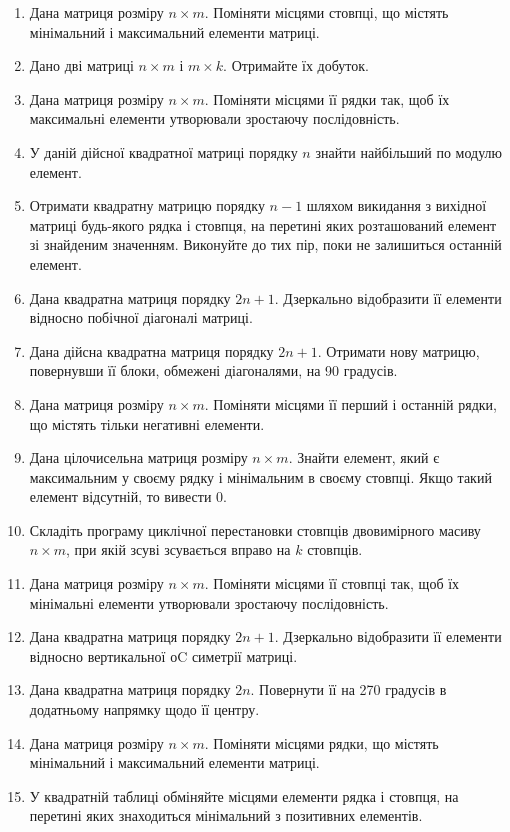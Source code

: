 \documentclass[a5paper,titlepage,openany,twoside,draft]{book_unv}%
\begin{document}
\begin{enumerate}
\item
  Дана матриця розміру $n \times m$. Поміняти місцями стовпці, що містять
  мінімальний і максимальний елементи матриці.
\item
  Дано дві матриці $n \times m$ і $m \times k$. Отримайте їх добуток.
\item
  Дана матриця розміру $n \times m$. Поміняти місцями її рядки так, щоб їх
  максимальні елементи утворювали зростаючу послідовність.
\item
  У даній дійсної квадратної матриці порядку $n$ знайти найбільший по
  модулю елемент.
\item
  Отримати квадратну матрицю порядку $n - 1$ шляхом викидання з вихідної
  матриці будь-якого рядка і стовпця, на перетині яких розташований
  елемент зі знайденим значенням. Виконуйте до тих пір, поки не
  залишиться останній елемент.
\item
  Дана квадратна матриця порядку $2n + 1$. Дзеркально відобразити її
  елементи відносно побічної діагоналі матриці.
\item
  Дана дійсна квадратна матриця порядку $2n + 1$. Отримати нову матрицю,
  повернувши її блоки, обмежені діагоналями, на 90 градусів.
\item
  Дана матриця розміру $n \times m$. Поміняти місцями її перший і останній
  рядки, що містять тільки негативні елементи.
\item
  Дана цілочисельна матриця розміру $n \times m$. Знайти елемент, який є
  максимальним у своєму рядку і мінімальним в своєму стовпці. Якщо такий
  елемент відсутній, то вивести 0.
\item
  Складіть програму циклічної перестановки стовпців двовимірного масиву
  $n \times m$, при якій зсуві зсувається вправо на $k$ стовпців.
\item
  Дана матриця розміру $n \times m$. Поміняти місцями її стовпці так, щоб їх
  мінімальні елементи утворювали зростаючу послідовність.
\item
  Дана квадратна матриця порядку $2n + 1$. Дзеркально відобразити її
  елементи відносно вертикальної оC симетрії матриці.
\item
  Дана квадратна матриця порядку $2n$. Повернути її на 270 градусів в
  додатньому напрямку щодо її центру.
\item
  Дана матриця розміру $n \times m$. Поміняти місцями рядки, що містять
  мінімальний і максимальний елементи матриці.
\item
  У квадратній таблиці обміняйте місцями елементи рядка і стовпця, на
  перетині яких знаходиться мінімальний з позитивних елементів.

\end{enumerate}
\end{document}
